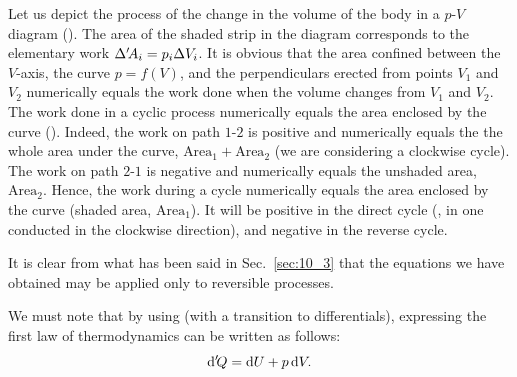Let us depict the process of the change in the volume of the body in a $p$-$V$ diagram (). The area of the shaded strip in the diagram corresponds to the elementary work $\Delta'\!A_i=p_i\Delta V_i$. It is obvious that the area confined between the $V$-axis, the curve $p=f(V)$, and the perpendiculars erected from points $V_1$ and $V_2$ numerically equals the work done when the volume changes from $V_1$ and $V_2$. The work done in a cyclic process numerically equals the area enclosed by the curve (). Indeed, the work on path $1$-$2$ is positive and numerically equals the the whole area under the curve, $\text{Area}_1+\text{Area}_2$ (we are considering a clockwise cycle). The work on path $2$-$1$ is negative and numerically equals the unshaded area, $\text{Area}_2$. Hence, the work during a cycle numerically equals the area enclosed by the curve (shaded area, $\text{Area}_1$). It will be positive in the direct cycle (\ie, in one conducted in the clockwise direction), and negative in the reverse cycle.

It is clear from what has been said in Sec.~\ref{sec:10_3} that the equations we have obtained may be applied only to reversible processes.

We must note that by using  (with a transition to differentials),  expressing the first law of thermodynamics can be written as follows:
\begin{equation}\label{eq:10_13}
	\mathrm{d}'\!Q = \mathrm{d} U + p\,\mathrm{d} V.
\end{equation}

